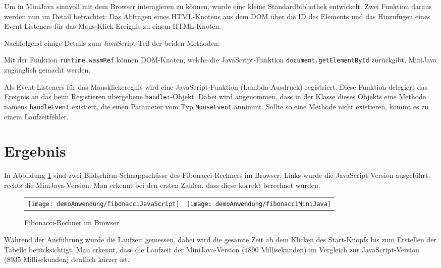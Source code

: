 Um in MiniJava sinnvoll mit dem Browser interagieren zu können, wurde eine kleine Standardbibliothek entwickelt. Zwei Funktion daraus werden nun im Detail betrachtet: Das Abfragen eines HTML-Knotens aus dem DOM über die ID des Elements und das Hinzufügen eines Event-Listeners für das Maus-Klick-Ereignis zu einem HTML-Knoten.




Nachfolgend einige Details zum JavaScript-Teil der beiden Methoden:

Mit der Funktion \lstinline{runtime.wasmRef} können DOM-Knoten, welche die Ja\-va\-Script-Funk\-tion \lstinline{document.getElementById} zurückgibt, MiniJava zugänglich gemacht werden.

Als Event-Listeners für das Mausklickeregnis wird eine JavaScript-Funktion (Lambda-Aus\-druck) registriert. Diese Funktion delegiert das Ereignis an das beim Registieren übergebene \lstinline{handler}-Objekt. Dabei wird angenommen, dass in der Klasse dieses Objekts eine Methode namens \lstinline{handleEvent} existiert, die einen Parameter vom Typ \lstinline{MouseEvent} annimmt. Sollte so eine Methode nicht existieren, kommt es zu einem Laufzeitfehler.

\section{Ergebnis}

In Abbildung \ref{fig:fibCalculatorBrowser} sind zwei Bildschirm-Schnappschüsse des Fibonacci-Rechners im Browser. Links wurde die JavaScript-Version ausgeführt, rechts die MiniJava-Version. Man erkennt bei den ersten Zahlen, dass diese korrekt berechnet wurden.

\begin{figure}[]
    \centering
    \begin{tabular}{c c}
        \texttt{[image: demoAnwendung/fibonacciJavaScript]} & \texttt{[image: demoAnwendung/fibonacciMiniJava]}
    \end{tabular}
    \caption{Fibonacci-Rechner im Browser}
    \label{fig:fibCalculatorBrowser}
\end{figure}

Während der Ausführung wurde die Laufzeit gemessen, dabei wird die gesamte Zeit ab dem Klicken des Start-Knopfs bis zum Erstellen der Tabelle berücksichtigt. Man erkennt, dass die Laufzeit der MiniJava-Version (4890 Millisekunden) im Vergleich zur JavaScript-Version (8935 Millisekunden) deutlich kürzer ist.

